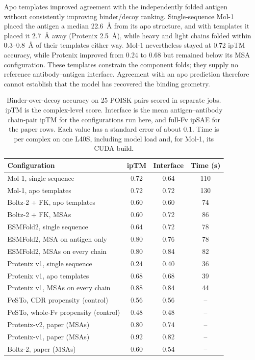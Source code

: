 \documentclass[11pt,a4paper]{article}
\begin{document}
Apo templates improved agreement with the independently folded antigen without consistently improving binder/decoy ranking.
Single-sequence Mol-1 placed the antigen a median 22.6~\AA{} from its apo structure, and with templates it placed it 2.7~\AA{} away (Protenix 2.5~\AA{}), while heavy and light chains folded within 0.3--0.8~\AA{} of their templates either way.
Mol-1 nevertheless stayed at 0.72 ipTM accuracy, while Protenix improved from 0.24 to 0.68 but remained below its MSA configuration.
These templates constrain the component folds; they supply no reference antibody--antigen interface.
Agreement with an apo prediction therefore cannot establish that the model has recovered the binding geometry.

\begin{table}[ht]
\centering
\caption{Binder-over-decoy accuracy on 25 POISK pairs scored in separate jobs. ipTM is the complex-level score. Interface is the mean antigen--antibody chain-pair ipTM for the configurations run here, and full-Fv ipSAE for the paper rows. Each value has a standard error of about 0.1. Time is per complex on one L40S, including model load and, for Mol-1, its CUDA build.}
\label{tab:separate}
\small
\begin{tabular}{@{}lccc@{}}
\toprule
Configuration & ipTM & Interface & Time (s) \\
\midrule
Mol-1, single sequence & 0.72 & 0.64 & 110 \\
Mol-1, apo templates & 0.72 & 0.72 & 130 \\
Boltz-2 + FK, apo templates & 0.60 & 0.60 & 74 \\
Boltz-2 + FK, MSAs & 0.60 & 0.72 & 86 \\
ESMFold2, single sequence & 0.64 & 0.72 & 78 \\
ESMFold2, MSA on antigen only & 0.80 & 0.76 & 78 \\
ESMFold2, MSAs on every chain & 0.80 & 0.84 & 82 \\
Protenix v1, single sequence & 0.24 & 0.40 & 36 \\
Protenix v1, apo templates & 0.68 & 0.68 & 39 \\
Protenix v1, MSAs on every chain & 0.88 & 0.84 & 44 \\
\midrule
PeSTo, CDR propensity (control) & 0.56 & 0.56 & -- \\
PeSTo, whole-Fv propensity (control) & 0.48 & 0.48 & -- \\
\midrule
Protenix-v2, paper (MSAs) & 0.80 & 0.74 & -- \\
Protenix-v1, paper (MSAs) & 0.92 & 0.82 & -- \\
Boltz-2, paper (MSAs) & 0.60 & 0.54 & -- \\
\bottomrule
\end{tabular}
\end{table}
\end{document}
